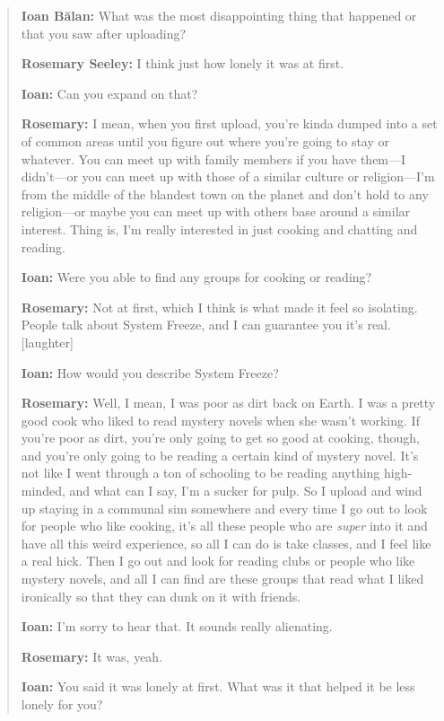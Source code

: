 \begin{quote}
\textbf{Ioan Bălan:} What was the most disappointing thing that happened or that you saw after uploading?

\textbf{Rosemary Seeley:} I think just how lonely it was at first.

\textbf{Ioan:} Can you expand on that?

\textbf{Rosemary:} I mean, when you first upload, you're kinda dumped into a set of common areas until you figure out where you're going to stay or whatever. You can meet up with family members if you have them---I didn't---or you can meet up with those of a similar culture or religion---I'm from the middle of the blandest town on the planet and don't hold to any religion---or maybe you can meet up with others base around a similar interest. Thing is, I'm really interested in just cooking and chatting and reading.

\textbf{Ioan:} Were you able to find any groups for cooking or reading?

\textbf{Rosemary:} Not at first, which I think is what made it feel so isolating. People talk about System Freeze, and I can guarantee you it's real. {[}laughter{]}

\textbf{Ioan:} How would you describe System Freeze?

\textbf{Rosemary:} Well, I mean, I was poor as dirt back on Earth. I was a pretty good cook who liked to read mystery novels when she wasn't working. If you're poor as dirt, you're only going to get so good at cooking, though, and you're only going to be reading a certain kind of mystery novel. It's not like I went through a ton of schooling to be reading anything high-minded, and what can I say, I'm a sucker for pulp. So I upload and wind up staying in a communal sim somewhere and every time I go out to look for people who like cooking, it's all these people who are \emph{super} into it and have all this weird experience, so all I can do is take classes, and I feel like a real hick. Then I go out and look for reading clubs or people who like mystery novels, and all I can find are these groups that read what I liked ironically so that they can dunk on it with friends.

\textbf{Ioan:} I'm sorry to hear that. It sounds really alienating.

\textbf{Rosemary:} It was, yeah.

\textbf{Ioan:} You said it was lonely at first. What was it that helped it be less lonely for you?


\end{quote}
